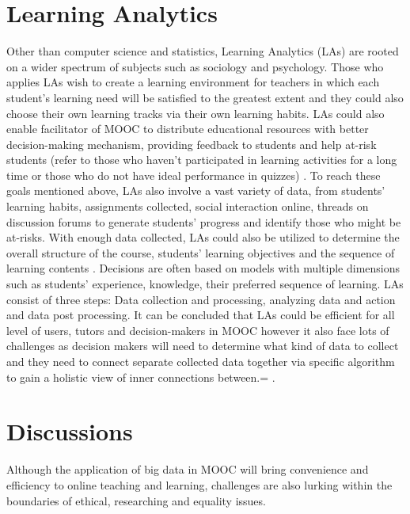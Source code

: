 \documentclass[sigconf]{acmart}
\begin{document}
\section{Learning Analytics}
Other than computer science and statistics, Learning Analytics (LAs) are rooted on a wider spectrum of subjects such as sociology and psychology. Those who applies LAs wish to create a learning environment for teachers in which each student's learning need will be satisfied to the greatest extent and they could also choose their own learning tracks via their own learning habits. LAs could also enable facilitator of MOOC to distribute educational resources with better decision-making mechanism, providing feedback to students and help at-risk students (refer to those who haven't participated in learning activities for a long time or those who do not have ideal performance in quizzes) \cite{Drachler2012}.
To reach these goals mentioned above, LAs also involve a vast variety of data, from students' learning habits, assignments collected, social interaction online, threads on discussion forums to generate students' progress and identify those who might be at-risks. With enough data collected, LAs could also be utilized to determine the overall structure of the course, students' learning objectives and the sequence of learning contents \cite{Berland2014}. Decisions are often based on models with multiple dimensions such as students' experience, knowledge, their preferred sequence of learning. 
LAs consist of three steps: Data collection and processing, analyzing data and action and data post processing. It can be concluded that LAs could be efficient for all level of users, tutors and decision-makers in MOOC however it also face lots of challenges as decision makers will need to determine what kind of data to collect and they need to connect separate collected data together via specific algorithm to gain a holistic view of inner connections between.= \cite{spector2014}.

\section{Discussions}
Although the application of big data in MOOC will bring convenience and efficiency to online teaching and learning, challenges are also lurking within the boundaries of ethical, researching and equality issues. 
\end{document}
